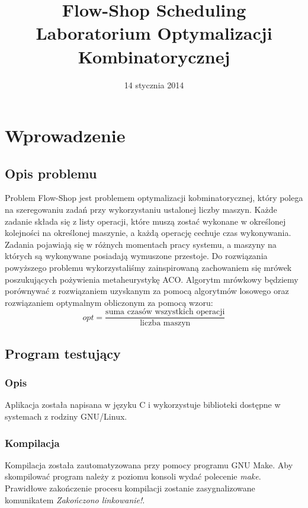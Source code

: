\documentclass[10pt,a4paper]{article}
\author{\authorthing}
\date{14 stycznia 2014}
\title{Flow-Shop Scheduling\\Laboratorium Optymalizacji Kombinatorycznej}
\begin{document}
\maketitle
\section{Wprowadzenie}
\subsection{Opis problemu}
Problem Flow-Shop jest problemem optymalizacji kobminatorycznej, który polega na szeregowaniu zadań przy wykorzystaniu ustalonej liczby maszyn. Każde zadanie składa się z listy operacji, które muszą zostać wykonane w określonej kolejności na określonej maszynie, a każdą operację cechuje czas wykonywania. Zadania pojawiają się w różnych momentach pracy systemu, a maszyny na których są wykonywane posiadają wymuszone przestoje.
Do rozwiązania powyższego problemu wykorzystaliśmy zainspirowaną zachowaniem się mrówek poszukujących pożywienia metaheurystykę ACO. Algorytm mrówkowy będziemy porównywać z rozwiązaniem uzyskanym za pomocą algorytmów losowego oraz rozwiązaniem optymalnym obliczonym za pomocą wzoru: \[ opt = \frac{\text{suma czasów wszystkich operacji}}{\text{liczba maszyn}} \]

\subsection{Program testujący}
\subsubsection{Opis}
Aplikacja została napisana w języku C i wykorzystuje biblioteki dostępne w systemach z rodziny GNU/Linux. 
\subsubsection{Kompilacja}
Kompilacja została zautomatyzowana przy pomocy programu GNU Make. Aby skompilować program należy z poziomu konsoli wydać polecenie \textit{make}. Prawidłowe zakończenie procesu kompilacji zostanie zasygnalizowane komunikatem \textit{Zakończono linkowanie!}.
\end{document}
